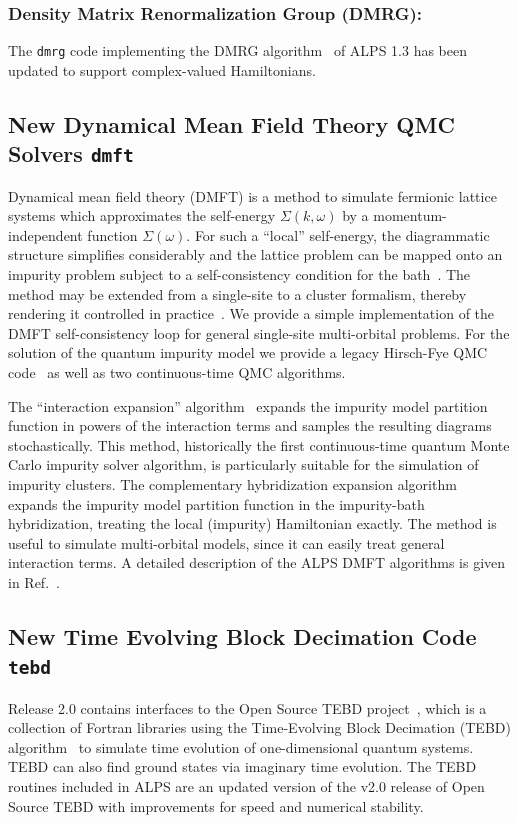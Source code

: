 \documentclass[12pt]{iopart}
\begin{document}
  
\subsubsection{Density Matrix Renormalization Group (DMRG):} The {\tt dmrg} code implementing the DMRG algorithm~\cite{White1992,Schollwock2005}  of ALPS 1.3 has been updated to support complex-valued Hamiltonians.

\subsection{New Dynamical Mean Field Theory QMC Solvers {\tt dmft}}
Dynamical mean field theory (DMFT) is a method to simulate fermionic lattice systems which approximates the self-energy $\Sigma(k,\omega)$ by a momentum-independent 
function $\Sigma(\omega)$. For such a ``local'' self-energy, the diagrammatic structure simplifies considerably and the lattice problem can be mapped onto an impurity problem subject to a self-consistency condition for the bath~\cite{Georges96,Kotliar06}. The method may be extended from a single-site to a cluster formalism, thereby rendering it controlled in practice~\cite{Maier05}.
We provide a simple implementation of the DMFT self-consistency loop for general single-site multi-orbital problems.
For the solution of the quantum impurity model we provide a legacy Hirsch-Fye QMC code~\cite{Hirsch86} as well as two continuous-time QMC algorithms.

The ``interaction expansion'' algorithm~\cite{Rubtsov04,Rubtsov05} expands the impurity model partition function in powers of the interaction terms and samples the resulting diagrams stochastically. This method, historically
the first continuous-time quantum Monte Carlo impurity solver algorithm, is particularly suitable for the simulation of impurity clusters.
The complementary hybridization expansion algorithm~\cite{Werner06,Werner06Kondo} expands the impurity model partition function in the impurity-bath hybridization, treating 
the local (impurity) Hamiltonian exactly. 
The method is useful to simulate multi-orbital models, since it can easily treat general interaction terms. A detailed description of the ALPS DMFT algorithms is given in Ref.~\cite{ALPSDMFT}.


\subsection{New Time Evolving Block Decimation Code {\tt tebd}}
Release 2.0 contains interfaces to the Open Source TEBD project~\cite{ostebd}, which is a collection of Fortran libraries using the Time-Evolving Block Decimation (TEBD) algorithm~\cite{vidal1, vidal2} to simulate time evolution of one-dimensional quantum systems.  TEBD can also find ground states via imaginary time evolution.  The TEBD routines included in ALPS are an updated version of the v2.0 release of Open Source TEBD with improvements for speed and numerical stability.
\end{document}
